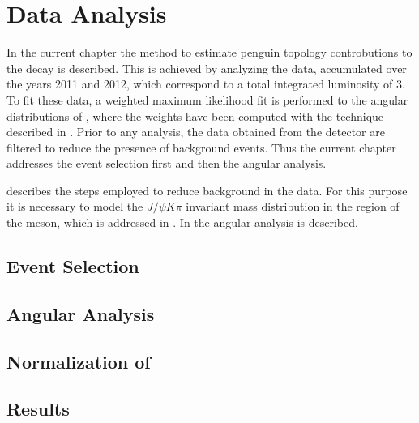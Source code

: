 \chapter{Data Analysis}
\label{Data_Analysis}

In the current chapter the method to estimate penguin topology controbutions to the \BsJpsiPhi decay
is described. This is achieved by analyzing the \runone \lhcb data, accumulated over the years 2011 and 2012,
which correspond to a total integrated luminosity of 3\invfb. To fit these data, a weighted maximum likelihood fit
is performed to the angular distributions of \BsJpsiKst, where the weights have been computed with the \sPlot
technique \cite{splot} described in .
Prior to any analysis, the data obtained from the detector are filtered to reduce the presence of
background events. Thus the current chapter addresses the event selection first and then the angular analysis.

 describes the steps employed to reduce background in the data. For this purpose
it is necessary to model the $J/\psi K\pi$ invariant mass distribution in the region of the \Bs meson, which
is addressed in . In  the angular analysis is described.\\

\section{Event Selection}
\label{Event_Selection}


\section{Angular Analysis}
\label{Angular_Analysis}


\section{Normalization of \BsJpsiKpi}
\label{Normalization}


\section{Results}
\label{Results}

